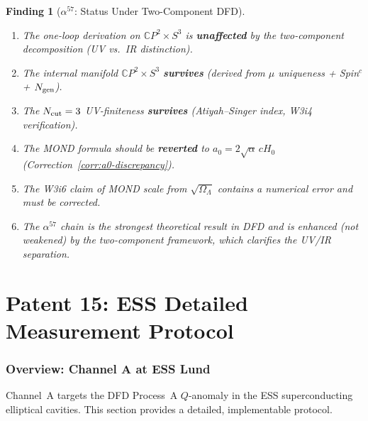 \documentclass[11pt]{article}
\newtheorem{finding}{Finding}
\newcommand{\aM}{a_0}
\newcommand{\Hzero}{H_0}
\newcommand{\mufd}{\mu}
\newcommand{\CP}{\mathbb{C}P}
\begin{document}
\begin{finding}[$\alpha^{57}$: Status Under Two-Component DFD]
\label{find:alpha57-final}
\begin{enumerate}
\item The one-loop derivation on $\CP^2 \times S^3$ is \textbf{unaffected}
  by the two-component decomposition (UV vs.\ IR distinction).
\item The internal manifold $\CP^2 \times S^3$ \textbf{survives}
  (derived from $\mufd$ uniqueness + Spin$^c$ + $N_{\rm gen}$).
\item The $N_{\rm cut} = 3$ UV-finiteness \textbf{survives}
  (Atiyah--Singer index, W3i4 verification).
\item The MOND formula should be \textbf{reverted} to
  $\aM = 2\sqrt{\alpha}\,c\Hzero$ (Correction~\ref{corr:a0-discrepancy}).
\item The W3i6 claim of MOND scale from $\sqrt{\Omega_\Lambda}$ contains
  a numerical error and must be corrected.
\item The $\alpha^{57}$ chain is the strongest theoretical result in
  DFD and is enhanced (not weakened) by the two-component framework,
  which clarifies the UV/IR separation.
\end{enumerate}
\end{finding}


\newpage
\part{Patent 15: ESS Detailed Measurement Protocol}
\label{part:P15}

\section{Overview: Channel A at ESS Lund}
\label{sec:ESS-overview}

Channel~A targets the DFD Process~A $Q$-anomaly in the ESS
superconducting elliptical cavities. This section provides a detailed,
implementable protocol.

\end{document}
